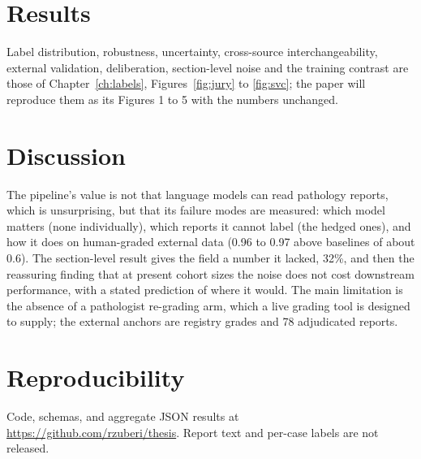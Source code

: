 \section{Results}
Label distribution, robustness, uncertainty, cross-source interchangeability, external validation, deliberation, section-level noise and the training contrast are those of Chapter~\ref{ch:labels}, Figures~\ref{fig:jury} to \ref{fig:svc}; the paper will reproduce them as its Figures 1 to 5 with the numbers unchanged.

\section{Discussion}
The pipeline's value is not that language models can read pathology reports, which is unsurprising, but that its failure modes are measured: which model matters (none individually), which reports it cannot label (the hedged ones), and how it does on human-graded external data (0.96 to 0.97 above baselines of about 0.6). The section-level result gives the field a number it lacked, 32\%, and then the reassuring finding that at present cohort sizes the noise does not cost downstream performance, with a stated prediction of where it would. The main limitation is the absence of a pathologist re-grading arm, which a live grading tool is designed to supply; the external anchors are registry grades and 78 adjudicated reports.

\section*{Reproducibility}
Code, schemas, and aggregate JSON results at \url{https://github.com/rzuberi/thesis}. Report text and per-case labels are not released.
